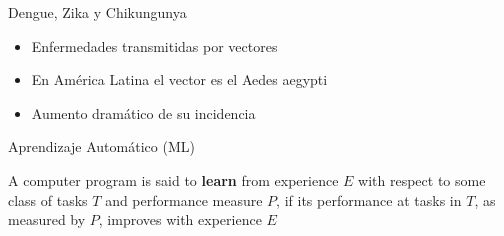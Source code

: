 \documentclass[10pt]{beamer}
\begin{document}
\begin{frame}{Dengue, Zika y Chikungunya}

  \begin{itemize}
  \item Enfermedades transmitidas por vectores
  \item En América Latina el vector es el Aedes aegypti
  \item Aumento dramático de su incidencia
  \end{itemize}

\end{frame}

\begin{frame}{Aprendizaje Automático (ML)}

  \begin{itemize}
  A computer program is said to \textbf{learn} from experience $E$ with
  respect to some class of tasks $T$ and performance measure $P$, if its
  performance at tasks in $T$, as measured by $P$, improves with experience $E$
  \end{itemize}

\end{frame}
\end{document}
